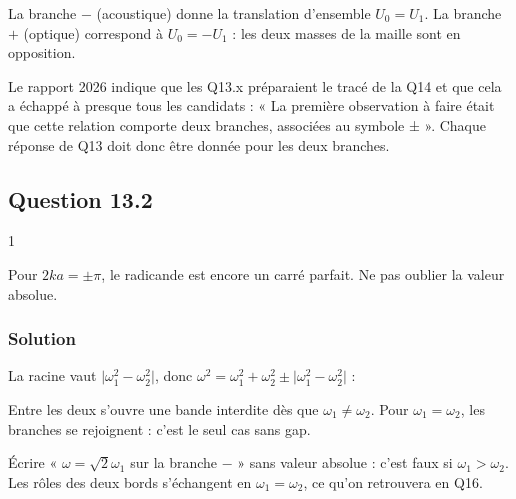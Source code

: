 \documentclass[11pt,a4paper]{article}
\newcommand{\equationajustee}[1]{%
  \sbox{\boiteequation}{$\displaystyle #1$}%
  \ifdim\wd\boiteequation>\linewidth
    \[\resizebox{\linewidth}{!}{\usebox{\boiteequation}}\]%
  \else
    \[#1\]%
  \fi}
\begin{document}
La branche \(-\) (acoustique) donne la translation d'ensemble \(U_0=U_1\). La branche \(+\) (optique) correspond à \(U_0=-U_1\) : les deux masses de la maille sont en opposition.

\begin{jury}

Le rapport 2026 indique que les Q13.x préparaient le tracé de la Q14 et que cela a échappé à presque tous les candidats : « La première observation à faire était que cette relation comporte deux branches, associées au symbole ± ». Chaque réponse de Q13 doit donc être donnée pour les deux branches.

\end{jury}

\hypertarget{question-13.2}{%
\subsection{Question 13.2}\label{question-13.2}}

\begin{indication}{1}

Pour \(2ka=\pm\pi\), le radicande est encore un carré parfait. Ne pas oublier la valeur absolue.

\end{indication}

\hypertarget{solution-17}{%
\subsubsection{Solution}\label{solution-17}}

La racine vaut \(\lvert\omega_1^2-\omega_2^2\rvert\), donc \(\omega^2=\omega_1^2+\omega_2^2\pm\lvert\omega_1^2-\omega_2^2\rvert\) :

\equationajustee{\boxed{\begin{aligned}
\text{branche }-&\ :\ \omega=\sqrt2\min(\omega_1,\omega_2)\\
\text{branche }+&\ :\ \omega=\sqrt2\max(\omega_1,\omega_2)
\end{aligned}}}

Entre les deux s'ouvre une bande interdite dès que \(\omega_1\neq\omega_2\). Pour \(\omega_1=\omega_2\), les branches se rejoignent : c'est le seul cas sans gap.

\begin{piege}

Écrire « \(\omega=\sqrt2\omega_1\) sur la branche \(-\) » sans valeur absolue : c'est faux si \(\omega_1>\omega_2\). Les rôles des deux bords s'échangent en \(\omega_1=\omega_2\), ce qu'on retrouvera en Q16.

\end{piege}
\end{document}
